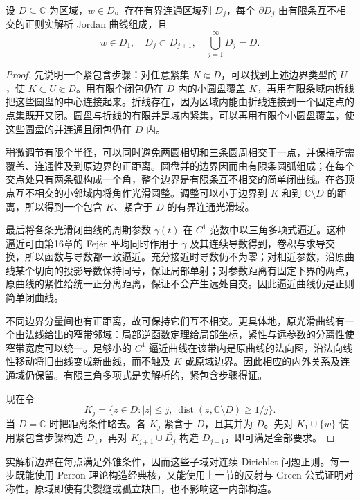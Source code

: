 \begin{lemma}[解析边界的内部穷竭]\label{b3:lem:17-analytic-exhaustion}
设 \(D\subseteq\mathbb C\) 为区域，\(w\in D\)。存在有界连通区域列 \(D_j\)，每个 \(\partial D_j\) 由有限条互不相交的正则实解析 Jordan 曲线组成，且
\[
 w\in D_1,\quad \overline{D_j}\subset D_{j+1},
 \quad\bigcup_{j=1}^\infty D_j=D.
\]
\end{lemma}
\begin{proof}
先说明一个紧包含步骤：对任意紧集 \(K\Subset D\)，可以找到上述边界类型的 \(U\)，使 \(K\subset U\Subset D\)。用有限个闭包仍在 \(D\) 内的小圆盘覆盖 \(K\)，再用有限条域内折线把这些圆盘的中心连接起来。折线存在，因为区域内能由折线连接到一个固定点的点集既开又闭。圆盘与折线的有限并是域内紧集，可以再用有限个小圆盘覆盖，使这些圆盘的并连通且闭包仍在 \(D\) 内。

稍微调节有限个半径，可以同时避免两圆相切和三条圆周相交于一点，并保持所需覆盖、连通性及到原边界的正距离。圆盘并的边界因而由有限条圆弧组成；在每个交点处只有两条弧构成一个角，整个边界是有限条互不相交的简单闭曲线。在各顶点互不相交的小邻域内将角作光滑圆整。调整可以小于边界到 \(K\) 和到 \(\mathbb C\setminus D\) 的距离，所以得到一个包含 \(K\)、紧含于 \(D\) 的有界连通光滑域。

最后将各条光滑闭曲线的周期参数 \(\gamma(t)\) 在 \(C^1\) 范数中以三角多项式逼近。这种逼近可由第16章的 Fej\'er 平均同时作用于 \(\gamma\) 及其连续导数得到，卷积与求导交换，所以函数与导数都一致逼近。充分接近时导数仍不为零；对相近参数，沿原曲线某个切向的投影导数保持同号，保证局部单射；对参数距离有固定下界的两点，原曲线的紧性给统一正分离距离，保证不会产生远处自交。因此逼近曲线仍是正则简单闭曲线。

不同边界分量间也有正距离，故可保持它们互不相交。更具体地，原光滑曲线有一个由法线给出的窄带邻域：局部逆函数定理给局部坐标，紧性与远参数的分离性使窄带宽度可以统一。足够小的 \(C^1\) 逼近曲线在该带内是原曲线的法向图，沿法向线性移动将旧曲线变成新曲线，而不触及 \(K\) 或原域边界。因此相应的内外关系及连通域仍保留。有限三角多项式是实解析的，紧包含步骤得证。

现在令
\[
 K_j=\{z\in D:|z|\le j,\ \operatorname{dist}(z,\mathbb C\setminus D)\ge1/j\}.
\]
当 \(D=\mathbb C\) 时把距离条件略去。各 \(K_j\) 紧含于 \(D\)，且其并为 \(D\)。先对 \(K_1\cup\{w\}\) 使用紧包含步骤构造 \(D_1\)，再对 \(K_{j+1}\cup\overline{D_j}\) 构造 \(D_{j+1}\)，即可满足全部要求。
\end{proof}

实解析边界在每点满足外锥条件，因而这些子域对连续 Dirichlet 问题正则。每一步既能使用 Perron 理论构造经典核，又能使用上一节的反射与 Green 公式证明对称性。原域即使有尖裂缝或孤立缺口，也不影响这一内部构造。

